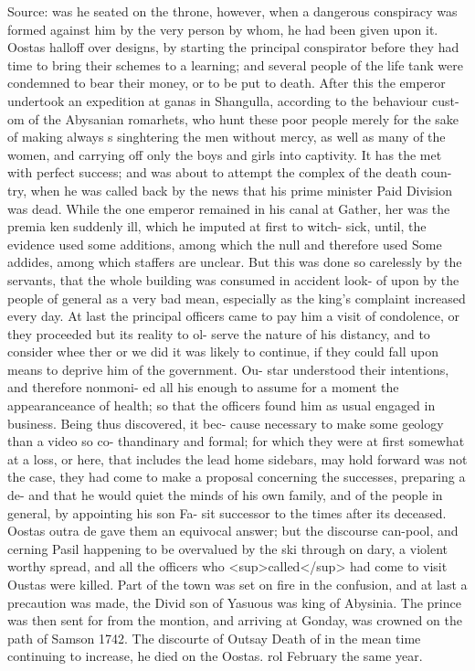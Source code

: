 \documentclass{article}
\begin{document}
Source: was he seated on the throne, however, when a dangerous conspiracy was formed against him by the very person by whom, he had been given upon it. Oostas halloff over designs, by starting the principal conspirator before they had time to bring their schemes to a learning; and several people of the life tank were condemned to bear their money, or to be put to death. After this the emperor undertook an expedition at ganas in Shangulla, according to the behaviour cust- om of the Abysanian romarhets, who hunt these poor people merely for the sake of making always s singhtering the men without mercy, as well as many of the women, and carrying off only the boys and girls into captivity. It has the met with perfect success; and was about to attempt the complex of the death coun- try, when he was called back by the news that his prime minister Paid Division was dead. While the one emperor remained in his canal at Gather, her was the premia ken suddenly ill, which he imputed at first to witch- sick, until, the evidence used some additions, among which the null and therefore used Some addides, among which staffers are unclear. But this was done so carelessly by the servants, that the whole building was consumed in accident look- of upon by the people of general as a very bad mean, especially as the king's complaint increased every day. At last the principal officers came to pay him a visit of condolence, or they proceeded but its reality to ol- serve the nature of his distancy, and to consider whee ther or we did it was likely to continue, if they could fall upon means to deprive him of the government. Ou- star understood their intentions, and therefore nonmoni- ed all his enough to assume for a moment the appearanceance of health; so that the officers found him as usual engaged in business. Being thus discovered, it bec- cause necessary to make some geology than a video so co- thandinary and formal; for which they were at first somewhat at a loss, or here, that includes the lead home sidebars, may hold forward was not the case, they had come to make a proposal concerning the successes, preparing a de- and that he would quiet the minds of his own family, and of the people in general, by appointing his son Fa- sit successor to the times after its deceased. Oostas outra de gave them an equivocal answer; but the discourse can-pool, and cerning Pasil happening to be overvalued by the ski through on dary, a violent worthy spread, and all the officers who <sup>called</sup> had come to visit Oustas were killed. Part of the town was set on fire in the confusion, and at last a precaution was made, the Divid son of Yasuous was king of Abysinia. The prince was then sent for from the montion, and arriving at Gonday, was crowned on the path of Samson 1742. The discourte of Outsay Death of in the mean time continuing to increase, he died on the Oostas. rol February the same year.
\end{document}
